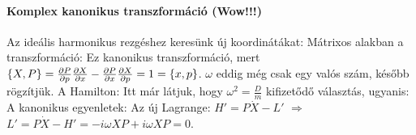    \paragraph{Komplex kanonikus transzformáció (Wow!!!)}
    
    Az ideális harmonikus rezgéshez keresünk új koordinátákat:
    Mátrixos alakban a transzformáció: 
    Ez kanonikus transzformáció, mert $\{X,P\}=\frac{\partial P}{\partial p}\frac{\partial X}{\partial x}-\frac{\partial P}{\partial x}\frac{\partial X}{\partial p}=1=\{x,p\}$. $\omega$ eddig még csak egy valós szám, később rögzítjük. A Hamilton:
    Itt már látjuk, hogy $\omega^2=\frac{D}{m}$ kifizetődő választás, ugyanis:
    A kanonikus egyenletek:
    Az új Lagrange: $H'=P\dot{X}-L'$ $\Rightarrow$ $L'=P\dot{X}-H'=-i\omega XP+i\omega XP=0$.
    
